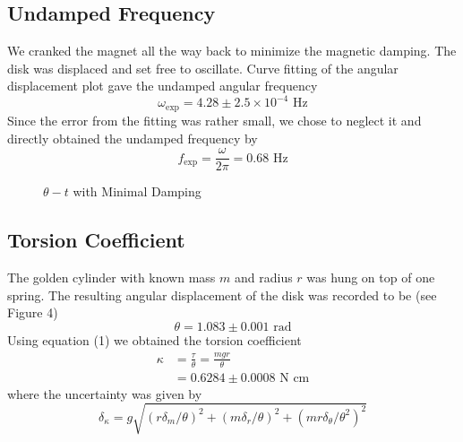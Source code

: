 \subsection{Undamped Frequency}
We cranked the magnet all the way back to minimize the magnetic damping. The disk was displaced and set free to oscillate. Curve fitting of the angular displacement plot gave the undamped angular frequency
\begin{equation}
\omega_{\text{exp}} = 4.28 \pm 2.5\times10^{-4}\text{ Hz}
\end{equation}
Since the error from the fitting was rather small, we chose to neglect it and directly obtained the undamped frequency by
\begin{equation}
f_{\text{exp}} = \frac{\omega}{2\pi}= 0.68\text{ Hz}
\end{equation}
\begin{figure}[h]
	\caption{$\theta-t$ with Minimal Damping}
\end{figure}

\subsection{Torsion Coefficient}
The golden cylinder with known mass $m$ and radius $r$ was hung on top of one spring. The resulting angular displacement of the disk was recorded to be (see Figure 4)
\begin{equation}
\theta = 1.083 \pm 0.001 \text{ rad}
\end{equation}
Using equation (1) we obtained the torsion coefficient
\begin{equation}
\begin{aligned}
\kappa &= \frac{\tau}{\theta}= \frac{mgr}{\theta}\\
&= 0.6284 \pm 0.0008 \text{ N cm}
\end{aligned}
\end{equation}
where the uncertainty was given by
\begin{equation}
\delta_{\kappa} = g\sqrt{(r\delta_m/\theta)^2+(m\delta_r/\theta)^2+(mr\delta_\theta/\theta^2)^2
}
\end{equation}

